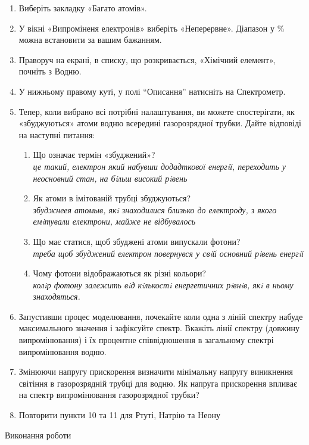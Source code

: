 \documentclass[a4paper,14pt]{extreport}
\begin{document}
\begin{enumerate}
\item Виберіть закладку «Багато атомів».
\item У вікні «Випроміненя електронів» виберіть «Неперервне». Діапазон у \% 
можна встановити за вашим бажанням.
\item Праворуч на екрані, в списку, що розкривається, «Хімічний елемент», почніть 
з Водню.
\item У нижньому правому куті, у полі “Описання” натисніть на Спектрометр.
\item Тепер, коли вибрано всі потрібні налаштування, ви можете спостерігати, як 
«збуджуються» атоми водню всередині газорозрядної трубки. Дайте відповіді 
на наступні питання:
	\begin{enumerate}
	\item Що означає термін «збуджений»?\\
	\emph{це такий, електрон який набувши додадткової
		енергiї, переходить у неосновний стан, на бiльш високий рiвень}
	\item Як атоми в імітованій трубці збуджуються?\\
	\emph{збуджнеея атомыв, якi знаходилися близько до електроду, з якого емiтували	електрони, майже не відбувалось}
	\item Що має статися, щоб збуджені атоми випускали фотони?\\
	\emph{треба щоб збуджений електрон повернувся у свiй основний рiвень енергiї}
	\item Чому фотони відображаються як різні кольори?\\
	\emph{колiр фотону залежить вiд кiлькостi енергетичних рiвнiв, якi в ньому знаходяться.}
	\end{enumerate}
\item Запустивши процес моделювання, почекайте коли одна з ліній спектру набуде 
максимального значення і зафіксуйте спектр. Вкажіть лінії спектру (довжину 
випромінювання) і їх процентне співвідношення в загальному спектрі 
випромінювання водню. 
\item Змінюючи напругу прискорення визначити мінімальну напругу виникнення 
світіння в газорозрядній трубці для водню. Як напруга прискорення впливає 
на спектр випромінювання газорозрядної трубки?
\item Повторити пункти 10 та 11 для Ртуті, Натрію та Неону
\end{enumerate}
\newpage
\begin{center}
Виконання роботи
\end{center}
\end{document}

